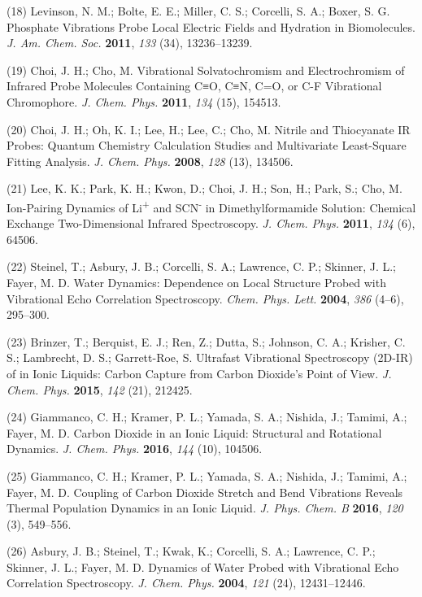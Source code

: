 \documentclass[]{article}
\begin{document}
(18) Levinson, N. M.; Bolte, E. E.; Miller, C. S.; Corcelli, S. A.;
Boxer, S. G. Phosphate Vibrations Probe Local Electric Fields and
Hydration in Biomolecules. \emph{J. Am. Chem. Soc.} \textbf{2011},
\emph{133} (34), 13236--13239.

(19) Choi, J. H.; Cho, M. Vibrational Solvatochromism and
Electrochromism of Infrared Probe Molecules Containing C≡O, C≡N, C=O, or
C-F Vibrational Chromophore. \emph{J. Chem. Phys.} \textbf{2011},
\emph{134} (15), 154513.

(20) Choi, J. H.; Oh, K. I.; Lee, H.; Lee, C.; Cho, M. Nitrile and
Thiocyanate IR Probes: Quantum Chemistry Calculation Studies and
Multivariate Least-Square Fitting Analysis. \emph{J. Chem. Phys.}
\textbf{2008}, \emph{128} (13), 134506.

(21) Lee, K. K.; Park, K. H.; Kwon, D.; Choi, J. H.; Son, H.; Park, S.;
Cho, M. Ion-Pairing Dynamics of Li\textsuperscript{+} and
SCN\textsuperscript{-} in Dimethylformamide Solution: Chemical Exchange
Two-Dimensional Infrared Spectroscopy. \emph{J. Chem. Phys.}
\textbf{2011}, \emph{134} (6), 64506.

(22) Steinel, T.; Asbury, J. B.; Corcelli, S. A.; Lawrence, C. P.;
Skinner, J. L.; Fayer, M. D. Water Dynamics: Dependence on Local
Structure Probed with Vibrational Echo Correlation Spectroscopy.
\emph{Chem. Phys. Lett.} \textbf{2004}, \emph{386} (4--6), 295--300.

(23) Brinzer, T.; Berquist, E. J.; Ren, Z.; Dutta, S.; Johnson, C. A.;
Krisher, C. S.; Lambrecht, D. S.; Garrett-Roe, S. Ultrafast Vibrational
Spectroscopy (2D-IR) of  in Ionic Liquids: Carbon
Capture from Carbon Dioxide's Point of View. \emph{J. Chem. Phys.}
\textbf{2015}, \emph{142} (21), 212425.

(24) Giammanco, C. H.; Kramer, P. L.; Yamada, S. A.; Nishida, J.;
Tamimi, A.; Fayer, M. D. Carbon Dioxide in an Ionic Liquid: Structural
and Rotational Dynamics. \emph{J. Chem. Phys.} \textbf{2016}, \emph{144}
(10), 104506.

(25) Giammanco, C. H.; Kramer, P. L.; Yamada, S. A.; Nishida, J.;
Tamimi, A.; Fayer, M. D. Coupling of Carbon Dioxide Stretch and Bend
Vibrations Reveals Thermal Population Dynamics in an Ionic Liquid.
\emph{J. Phys. Chem. B} \textbf{2016}, \emph{120} (3), 549--556.

(26) Asbury, J. B.; Steinel, T.; Kwak, K.; Corcelli, S. A.; Lawrence, C.
P.; Skinner, J. L.; Fayer, M. D. Dynamics of Water Probed with
Vibrational Echo Correlation Spectroscopy. \emph{J. Chem. Phys.}
\textbf{2004}, \emph{121} (24), 12431--12446.
\end{document}

